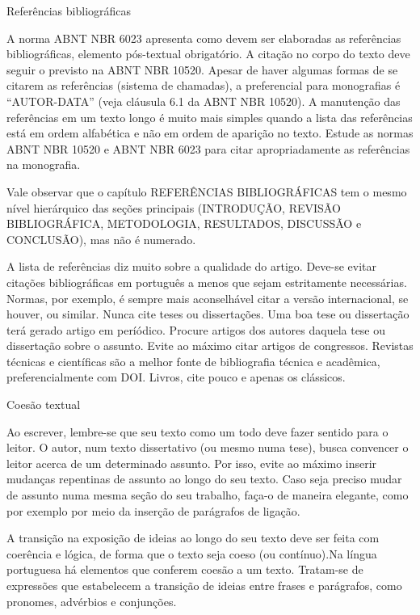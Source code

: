 \begin{enumerate}[label=\alph*)]
{\bfseries \item  Referências bibliográficas}

A norma ABNT NBR 6023 apresenta como devem ser elaboradas as referências bibliográficas, elemento pós-textual obrigatório. A citação no corpo do texto deve seguir o previsto na ABNT NBR 10520. Apesar de haver algumas formas de se citarem as referências (sistema de chamadas), a preferencial para monografias é “AUTOR-DATA” (veja cláusula 6.1 da ABNT NBR 10520). A manutenção das referências em um texto longo é muito mais simples quando a lista das referências está em ordem alfabética e não em ordem de aparição no texto. Estude as normas ABNT NBR 10520 e ABNT NBR 6023 para citar apropriadamente as referências na monografia.

Vale observar que o capítulo REFERÊNCIAS BIBLIOGRÁFICAS tem o mesmo nível hierárquico das seções principais (INTRODUÇÃO, REVISÃO BIBLIOGRÁFICA, METODOLOGIA, RESULTADOS, DISCUSSÃO e CONCLUSÃO), mas não é numerado.

A lista de referências diz muito sobre a qualidade do artigo. Deve-se evitar citações bibliográficas em português a menos que sejam estritamente necessárias. Normas, por exemplo, é sempre mais aconselhável citar a versão internacional, se houver, ou similar. Nunca cite teses ou dissertações. Uma boa tese ou dissertação terá gerado artigo em períódico. Procure artigos dos autores daquela tese ou dissertação sobre o assunto. Evite ao máximo citar artigos de congressos. Revistas técnicas e científicas são a melhor fonte de bibliografia técnica e acadêmica, preferencialmente com DOI. Livros, cite pouco e apenas os clássicos.

{\bfseries \item  Coesão textual}

Ao escrever, lembre-se que seu texto como um todo deve fazer sentido para o leitor. O autor, num texto dissertativo (ou mesmo numa tese), busca convencer o leitor acerca de um determinado assunto. Por isso, evite ao máximo inserir mudanças repentinas de assunto ao longo do seu texto. Caso seja preciso mudar de assunto numa mesma seção do seu trabalho, faça-o de maneira elegante, como por exemplo por meio da inserção de parágrafos de ligação.

A transição na exposição de ideias ao longo do seu texto deve ser feita com coerência e lógica, de forma que o texto seja coeso (ou contínuo).Na língua portuguesa há elementos que conferem coesão a um texto. Tratam-se de expressões que estabelecem a transição de ideias entre frases e parágrafos, como pronomes, advérbios e conjunções.


\end{enumerate}
